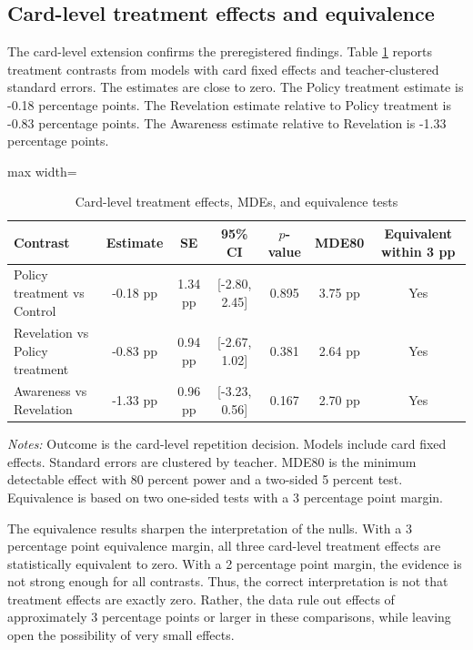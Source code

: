 \documentclass[12pt,a4paper]{article}
\newcommand{\ci}[2]{[#1, #2]}
\newcommand{\tabnote}[1]{\vspace{0.3em}\parbox{0.94\textwidth}{\footnotesize \textit{Notes:} #1}}
\begin{document}
\subsection{Card-level treatment effects and equivalence}

The card-level extension confirms the preregistered findings. Table \ref{tab:card_treat} reports treatment contrasts from models with card fixed effects and teacher-clustered standard errors. The estimates are close to zero. The Policy treatment estimate is -0.18 percentage points. The Revelation estimate relative to Policy treatment is -0.83 percentage points. The Awareness estimate relative to Revelation is -1.33 percentage points.

\begin{table}[!htbp]
\centering
\caption{Card-level treatment effects, MDEs, and equivalence tests}
\label{tab:card_treat}
\begin{threeparttable}
\begin{adjustbox}{max width=\textwidth}
\begin{tabular}{lcccccc}
\toprule
Contrast & Estimate & SE & 95\% CI & \(p\)-value & MDE80 & Equivalent within 3 pp \\
\midrule
Policy treatment vs Control & -0.18 pp & 1.34 pp & \ci{-2.80}{2.45} & 0.895 & 3.75 pp & Yes \\
Revelation vs Policy treatment & -0.83 pp & 0.94 pp & \ci{-2.67}{1.02} & 0.381 & 2.64 pp & Yes \\
Awareness vs Revelation & -1.33 pp & 0.96 pp & \ci{-3.23}{0.56} & 0.167 & 2.70 pp & Yes \\
\bottomrule
\end{tabular}
\end{adjustbox}
\tabnote{Outcome is the card-level repetition decision. Models include card fixed effects. Standard errors are clustered by teacher. MDE80 is the minimum detectable effect with 80 percent power and a two-sided 5 percent test. Equivalence is based on two one-sided tests with a 3 percentage point margin.}
\end{threeparttable}
\end{table}

The equivalence results sharpen the interpretation of the nulls. With a 3 percentage point equivalence margin, all three card-level treatment effects are statistically equivalent to zero. With a 2 percentage point margin, the evidence is not strong enough for all contrasts. Thus, the correct interpretation is not that treatment effects are exactly zero. Rather, the data rule out effects of approximately 3 percentage points or larger in these comparisons, while leaving open the possibility of very small effects.
\end{document}
